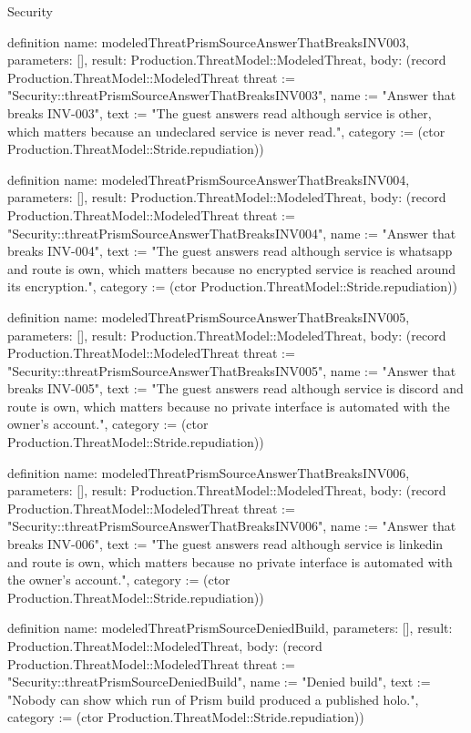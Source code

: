 \begin{lexlean}{Security}
\begin{semanticmodule}
definition{
  name: modeledThreatPrismSourceAnswerThatBreaksINV003,
  parameters: [],
  result: Production.ThreatModel::ModeledThreat,
  body: (record Production.ThreatModel::ModeledThreat {threat := "Security::threatPrismSourceAnswerThatBreaksINV003", name := "Answer that breaks INV-003", text := "The guest answers read although service is other, which matters because an undeclared service is never read.", category := (ctor Production.ThreatModel::Stride.repudiation)})
}

definition{
  name: modeledThreatPrismSourceAnswerThatBreaksINV004,
  parameters: [],
  result: Production.ThreatModel::ModeledThreat,
  body: (record Production.ThreatModel::ModeledThreat {threat := "Security::threatPrismSourceAnswerThatBreaksINV004", name := "Answer that breaks INV-004", text := "The guest answers read although service is whatsapp and route is own, which matters because no encrypted service is reached around its encryption.", category := (ctor Production.ThreatModel::Stride.repudiation)})
}

definition{
  name: modeledThreatPrismSourceAnswerThatBreaksINV005,
  parameters: [],
  result: Production.ThreatModel::ModeledThreat,
  body: (record Production.ThreatModel::ModeledThreat {threat := "Security::threatPrismSourceAnswerThatBreaksINV005", name := "Answer that breaks INV-005", text := "The guest answers read although service is discord and route is own, which matters because no private interface is automated with the owner's account.", category := (ctor Production.ThreatModel::Stride.repudiation)})
}

definition{
  name: modeledThreatPrismSourceAnswerThatBreaksINV006,
  parameters: [],
  result: Production.ThreatModel::ModeledThreat,
  body: (record Production.ThreatModel::ModeledThreat {threat := "Security::threatPrismSourceAnswerThatBreaksINV006", name := "Answer that breaks INV-006", text := "The guest answers read although service is linkedin and route is own, which matters because no private interface is automated with the owner's account.", category := (ctor Production.ThreatModel::Stride.repudiation)})
}

definition{
  name: modeledThreatPrismSourceDeniedBuild,
  parameters: [],
  result: Production.ThreatModel::ModeledThreat,
  body: (record Production.ThreatModel::ModeledThreat {threat := "Security::threatPrismSourceDeniedBuild", name := "Denied build", text := "Nobody can show which run of Prism build produced a published holo.", category := (ctor Production.ThreatModel::Stride.repudiation)})
}


\end{semanticmodule}
\end{lexlean}
